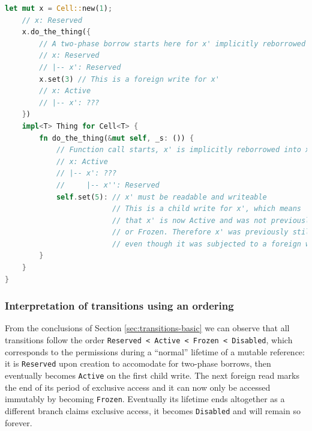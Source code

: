 \documentclass[a4paper,11pt]{article}
\theoremstyle{plain}
\theoremstyle{definition}
\theoremstyle{remark}
\newcommand{\tperm}[1]{\texttt{#1}}
\begin{document}
\begin{lstlisting}[language=rust]
    let mut x = Cell::new(1);
    // x: Reserved
    x.do_the_thing({
        // A two-phase borrow starts here for x' implicitly reborrowed from x
        // x: Reserved
        // |-- x': Reserved
        x.set(3) // This is a foreign write for x'
        // x: Active
        // |-- x': ???
    })
    impl<T> Thing for Cell<T> {
        fn do_the_thing(&mut self, _s: ()) {
            // Function call starts, x' is implicitly reborrowed into x''
            // x: Active
            // |-- x': ???
            //     |-- x'': Reserved
            self.set(5): // x' must be readable and writeable
                         // This is a child write for x', which means
                         // that x' is now Active and was not previously Disabled
                         // or Frozen. Therefore x' was previously still Reserved,
                         // even though it was subjected to a foreign write.
        }
    }
}
\end{lstlisting}

\subsubsection{Interpretation of transitions using an ordering}

From the conclusions of Section \ref{sec:transitions-basic} we can observe that all transitions follow the order
\tperm{Reserved < Active < Frozen < Disabled}, which corresponds to the permissions
during a ``normal'' lifetime of a mutable reference: it is \tperm{Reserved} upon creation
to accomodate for two-phase borrows, then eventually becomes \tperm{Active} on the first
child write. The next foreign read marks the end of its period of exclusive access
and it can now only be accessed immutably by becoming \tperm{Frozen}. Eventually its
lifetime ends altogether as a different branch claims exclusive access, it
becomes \tperm{Disabled} and will remain so forever.
\end{document}
